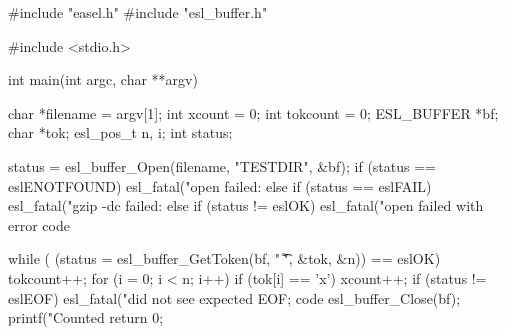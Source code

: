 \begin{cchunk}
#include "easel.h"
#include "esl_buffer.h"

#include <stdio.h>

int main(int argc, char **argv)
{
  char       *filename = argv[1];
  int         xcount   = 0;
  int         tokcount = 0;
  ESL_BUFFER *bf;
  char       *tok;
  esl_pos_t   n, i;
  int         status;

  status = esl_buffer_Open(filename, "TESTDIR", &bf);
  if      (status == eslENOTFOUND) esl_fatal("open failed: %
  else if (status == eslFAIL)      esl_fatal("gzip -dc failed: %
  else if (status != eslOK)        esl_fatal("open failed with error code %
  
  while ( (status = esl_buffer_GetToken(bf, " \t\r\n", &tok, &n)) == eslOK)
    {
      tokcount++;
      for (i = 0; i < n; i++)
	if (tok[i] == 'x') xcount++;
    }
  if (status != eslEOF) esl_fatal("did not see expected EOF; code %
  esl_buffer_Close(bf);
  printf("Counted %
  return 0;
}
\end{cchunk}
